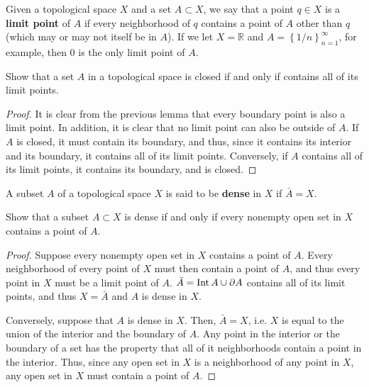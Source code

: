 \documentclass{mathnotes}
\begin{document}
\begin{defn}
    Given a topological space $X$ and a set $A\subset X$, we say that a point $q\in X$ is a \textbf{limit point} of $A$ if every neighborhood
    of $q$ contains a point of $A$ other than $q$ (which may or may not itself be in $A$). If we let $X=\mathbb{R}$ and $A=\left\{ 1/n \right\}_{n=1}^\infty$,
    for example, then 0 is the only limit point of $A$.
\end{defn}

\begin{exc}
    Show that a set $A$ in a topological space is closed if and only if contains all of its limit points.
\end{exc}
\begin{proof}
    It is clear from the previous lemma that every boundary point is also a limit point. In addition, it is clear that no limit point
    can also be outside of $A$.  If $A$ is closed, it must contain its boundary, and thus, since it contains its interior and its
    boundary, it contains all of its limit points. Conversely, if $A$ contains all of its limit points, it contains its boundary,
    and is closed.
\end{proof}

\begin{defn}
    A subset $A$ of a topological space $X$ is said to be \textbf{dense} in $X$ if $\bar{A}=X$.
\end{defn}

\begin{exc}
    Show that a subset $A\subset X$ is dense if and only if every nonempty open set in $X$ contains a point of $A$.
\end{exc}
\begin{proof}
    Suppose every nonempty open set in $X$ contains a point of $A$. Every neighborhood of every point of $X$ must then contain a point
    of $A$, and thus every point in $X$ must be a limit point of $A$. $\bar{A}=\operatorname{Int}{A}\cup\partial A$ contains all of its limit points,
    and thus $X=\bar{A}$ and $A$ is dense in $X$.

    Conversely, suppose that $A$ is dense in $X$. Then, $\bar{A}=X$, i.e. $X$ is equal to the union of the interior and the boundary
    of $A$. Any point in the interior or the boundary of a set has the property that all of it neighborhoods contain a point in the interior.
    Thus, since any open set in $X$ is a neighborhood of any point in $X$, any open set in $X$ must contain a point of $A$.
\end{proof}
\end{document}
